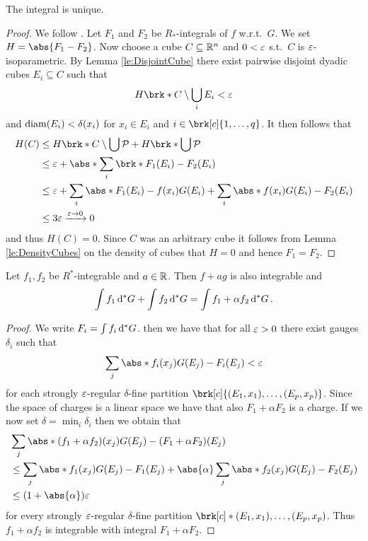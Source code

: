 \begin{claim}
The integral is unique.
\end{claim}
\begin{proof}
We follow \cite[Proposition 3.4]{Pfe2016}. Let $F_1$ and $F_2$ be $R_*$-integrals of $f$ w.r.t.\ $G$. We set $H=\abs{F_1-F_2}$. Now choose a cube $C\subseteq \mathbb{R}^n$ and $0<\varepsilon$ s.t.\ $C$ is $\varepsilon$-isoparametric. By Lemma \ref{le:DisjointCube} there exist pairwise disjoint dyadic cubes $E_i\subseteq C$ such that
\begin{align*}
	H\brk*{C\setminus \bigcup_iE_i}<\e
\end{align*}
and $\operatorname{diam}(E_i)<\delta(x_i)$ for $x_i\in E_i$ and $i\in\brk[c]{1,\dots,q}$. It then follows that
\begin{align*}
	H(C)
	&\leq H\brk*{C\setminus \bigcup\cP}+H\brk*{\bigcup\cP} \\
	&\leq\e+\abs*{\sum_i\brk*{F_1(E_i)-F_2(E_i)}} \\
	&\leq \e+\sum_i\abs*{F_1(E_i)-f(x_i)G(E_i)} +\sum_i\abs*{f(x_i)G(E_i)-F_2(E_i)} \\
	&\leq 3\e\xrightarrow{\e\to0}0
\end{align*}
and thus $H(C)=0$. Since $C$ was an arbitrary cube it follows from 
Lemma \ref{le:DensityCubes} on the density of cubes that $H=0$ and hence $F_1=F_2$.

\end{proof}

\begin{claim}
Let $f_1,f_2$ be $R^*$-integrable and $a\in\mathbb{R}$. Then $f+ag$ is also integrable and
\begin{align*}
	\int f_1\,\mathrm{d} ^*G + \int f_2\,\mathrm{d} ^*G=\int f_1+\alpha f_2\,\mathrm{d} ^*G\,.
\end{align*}
\end{claim}

\begin{proof}
We write $F_i=\int f_i\,\mathrm{d} ^*G$. then we have that for all $\varepsilon>0$ there exist gauges $\delta_i$ such that
\begin{align*}
	\sum_j\abs*{f_i(x_j)G(E_j)-F_i(E_j)}<\e
\end{align*}
for each strongly $\varepsilon$-regular $\delta$-fine partition $\brk[c]{(E_1,x_1),\dots,(E_p,x_p)}$. Since the space of charges is a linear space we have that also $F_1+\alpha F_2$ is a charge.
If we now set $\delta=\min_i\delta_i$ then we obtain that
\begin{align*}
	&\sum_j\abs*{(f_1+\alpha f_2)(x_j)G(E_j)-(F_1+\alpha F_2)(E_j)} \\
	&\leq \sum_j\abs*{f_1(x_j)G(E_j)-F_1(E_j)}+\abs{\alpha}\sum_j\abs*{f_2(x_j)G(E_j)-F_2(E_j)} \\
	&\leq (1+\abs{\alpha})\e
\end{align*}
for every strongly $\varepsilon$-regular $\delta$-fine partition $\brk[c]*{(E_1,x_1),\dots,(E_p,x_p)}$. Thus $f_1+\alpha f_2$ is integrable with integral $F_1+\alpha F_2$.
\end{proof}



